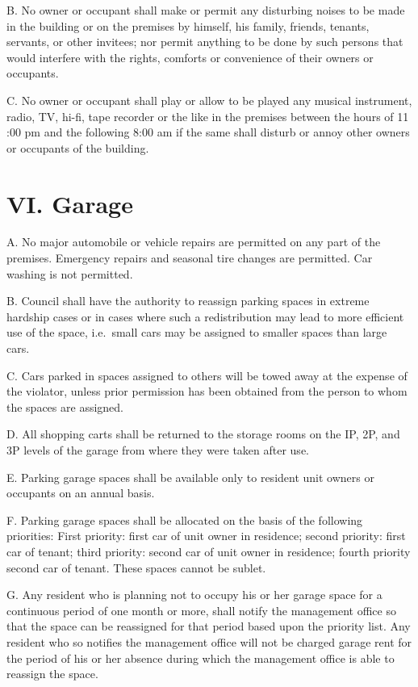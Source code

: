 \documentclass[
]{book}
\begin{document}
B. No owner or occupant shall make or permit any disturbing noises to be made in the building or on the premises by himself, his family, friends, tenants, servants, or other invitees; nor permit anything to be done by such persons that would interfere with the rights, comforts or convenience of their owners or occupants.

C. No owner or occupant shall play or allow to be played any musical instrument, radio, TV, hi-fi, tape recorder or the like in the premises between the hours of 11 :00 pm and the following 8:00 am if the same shall disturb or annoy other owners or occupants of the building.

\hypertarget{vi.-garage-2}{%
\section*{VI. Garage}\label{vi.-garage-2}}

A. No major automobile or vehicle repairs are permitted on any part of the premises. Emergency repairs and seasonal tire changes are permitted. Car washing is not permitted.

B. Council shall have the authority to reassign parking spaces in extreme hardship cases or in cases where such a redistribution may lead to more efficient use of the space, i.e.~small cars may be assigned to smaller spaces than large cars.

C. Cars parked in spaces assigned to others will be towed away at the expense of the violator, unless prior permission has been obtained from the person to whom the spaces are assigned.

D. All shopping carts shall be returned to the storage rooms on the IP, 2P, and 3P levels of the garage from where they were taken after use.

E. Parking garage spaces shall be available only to resident unit owners or occupants on an annual basis.

F. Parking garage spaces shall be allocated on the basis of the following priorities: First priority: first car of unit owner in residence; second priority: first car of tenant; third priority: second car of unit owner in residence; fourth priority second car of tenant. These spaces cannot be sublet.

G. Any resident who is planning not to occupy his or her garage space for a continuous period of one month or more, shall notify the management office so that the space can be reassigned for that period based upon the priority list. Any resident who so notifies the management office will not be charged garage rent for the period of his or her absence during which the management office is able to reassign the space.
\end{document}
